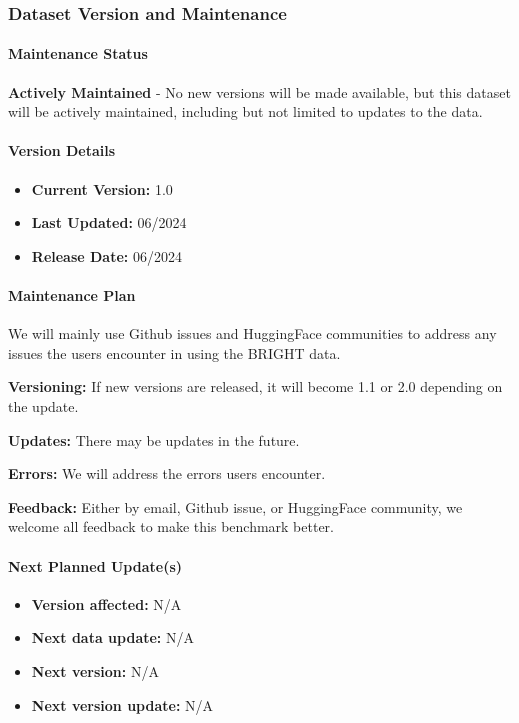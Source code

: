 \subsubsection{Dataset Version and Maintenance}

\paragraph{Maintenance Status}
\textbf{Actively Maintained} - No new versions will be made available, but this dataset will be actively maintained, including but not limited to updates to the data.

\paragraph{Version Details}
\begin{itemize}
    \item \textbf{Current Version:} 1.0
    \item \textbf{Last Updated:} 06/2024
    \item \textbf{Release Date:} 06/2024
\end{itemize}

\paragraph{Maintenance Plan}
We will mainly use Github issues and HuggingFace communities to address any issues the users encounter in using the BRIGHT data.

\textbf{Versioning:} If new versions are released, it will become 1.1 or 2.0 depending on the update.

\textbf{Updates:} There may be updates in the future.

\textbf{Errors:} We will address the errors users encounter.

\textbf{Feedback:} Either by email, Github issue, or HuggingFace community, we welcome all feedback to make this benchmark better.

\paragraph{Next Planned Update(s)}
\begin{itemize}
    \item \textbf{Version affected:} N/A
    \item \textbf{Next data update:} N/A
    \item \textbf{Next version:} N/A
    \item \textbf{Next version update:} N/A
\end{itemize}

